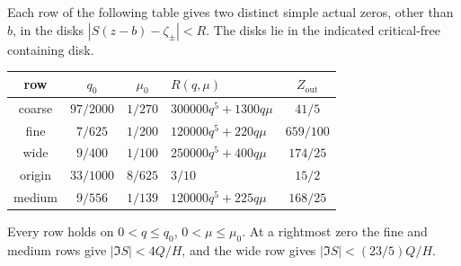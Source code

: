 \begin{proposition}\label{lt:quartic}\label{lt:fine200}\label{lt:wideD100}
Each row of the following table gives two distinct simple actual zeros,
other than $b$, in the disks $|S(z-b)-\zeta_\pm|<R$.
The disks lie in the indicated critical-free containing disk.
\begin{center}\small
\begin{tabular}{ccclc}
\toprule
row&$q_0$&$\mu_0$&$R(q,\mu)$&$Z_{\mathrm{out}}$\\\midrule
coarse&$97/2000$&$1/270$&$300000q^5+1300q\mu$&$41/5$\\
fine&$7/625$&$1/200$&$120000q^5+220q\mu$&$659/100$\\
wide&$9/400$&$1/100$&$250000q^5+400q\mu$&$174/25$\\
origin&$33/1000$&$8/625$&$3/10$&$15/2$\\
medium&$9/556$&$1/139$&$120000q^5+225q\mu$&$168/25$\\\bottomrule
\end{tabular}
\end{center}
Every row holds on $0<q\le q_0$, $0<\mu\le\mu_0$.
At a rightmost zero the fine and medium rows give
$|\Im S|<4Q/H$, and the wide row gives $|\Im S|<(23/5)Q/H$.
\end{proposition}
